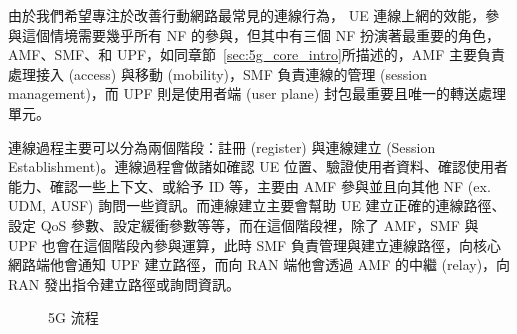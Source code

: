 由於我們希望專注於改善行動網路最常見的連線行為， UE 連線上網的效能，參與這個情境需要幾乎所有 NF 的參與，但其中有三個 NF 扮演著最重要的角色，AMF、SMF、和 UPF，如同章節~\ref{sec:5g_core_intro}所描述的，AMF 主要負責處理接入 (access) 與移動 (mobility)，SMF 負責連線的管理 (session management)，而 UPF 則是使用者端 (user plane) 封包最重要且唯一的轉送處理單元。

連線過程主要可以分為兩個階段：註冊 (register) 與連線建立 (Session Establishment)。連線過程會做諸如確認 UE 位置、驗證使用者資料、確認使用者能力、確認一些上下文、或給予 ID 等，主要由 AMF 參與並且向其他 NF (ex. UDM, AUSF) 詢問一些資訊。而連線建立主要會幫助 UE 建立正確的連線路徑、設定 QoS 參數、設定緩衝參數等等，而在這個階段裡，除了 AMF，SMF 與 UPF 也會在這個階段內參與運算，此時 SMF 負責管理與建立連線路徑，向核心網路端他會通知 UPF 建立路徑，而向 RAN 端他會透過 AMF 的中繼 (relay)，向 RAN 發出指令建立路徑或詢問資訊。

\begin{figure}[htbp]
  \centering
  \caption[5G 流程]{{\footnotesize 5G 流程~\cite{3gpp.23.502}}}
  \label{fig:5g_procedure}
\end{figure}



